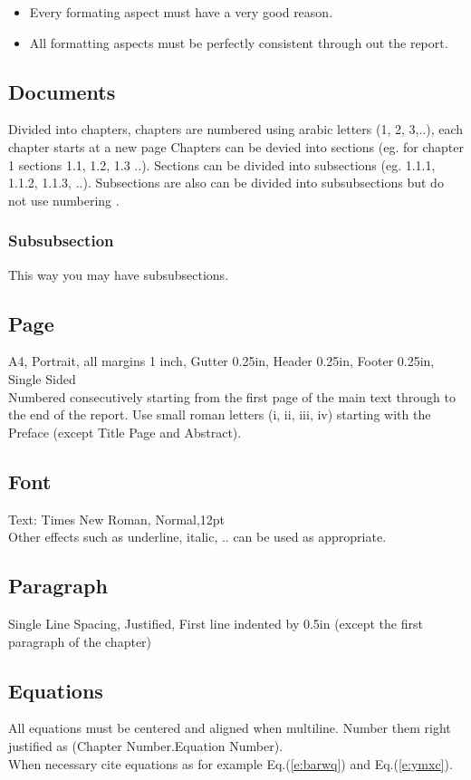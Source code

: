 \begin{itemize}
 \item Every formating aspect must have a very good reason.
 \item All formatting aspects must be perfectly consistent through out the report. 
\end{itemize}


\subsection{Documents}
Divided into chapters, chapters are numbered using arabic letters (1, 2, 3,..), each chapter starts at a new page
Chapters can be devied into sections (eg. for chapter 1 sections 1.1, 1.2, 1.3 ..). Sections can be divided into subsections (eg. 1.1.1, 1.1.2, 1.1.3, ..). Subsections are also can be divided into subsubsections but do not use numbering \cite{batteryuniversity}.

\subsubsection{Subsubsection}
This way you may have subsubsections.

\subsection{Page}
A4, Portrait, all margins 1 inch, Gutter 0.25in, Header 0.25in, Footer 0.25in, Single Sided\\
Numbered consecutively starting from the first page of the main text through to the end of the report. Use small roman letters (i, ii, iii, iv) starting with the Preface (except Title Page and Abstract).
 
\subsection{Font}
Text: Times New Roman, Normal,12pt\\
Other effects such as underline, italic, .. can be used as appropriate.

\subsection{Paragraph}
Single Line Spacing, Justified, First line indented by 0.5in (except the first paragraph of the chapter)

\subsection{Equations}
All equations must be centered and aligned when multiline. Number them right justified as (Chapter Number.Equation Number). \\
When necessary cite equations as for example Eq.(\ref{e:barwq}) and Eq.(\ref{e:ymxc}).

